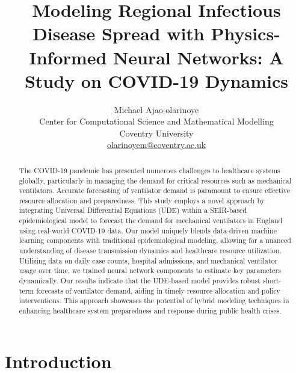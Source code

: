 \documentclass[12pt]{article}
\title{Modeling Regional Infectious Disease Spread with Physics-Informed Neural Networks: A Study on COVID-19 Dynamics}
\author{Michael Ajao-olarinoye \\
    Center for Computational Science and Mathematical Modelling \\
    Coventry University \\
    \url{olarinoyem@coventry.ac.uk}}
\date{}
\begin{document}
\maketitle

\begin{abstract}
    The COVID-19 pandemic has presented numerous challenges to healthcare systems globally, particularly in managing the demand for critical resources such as mechanical ventilators. Accurate forecasting of ventilator demand is paramount to ensure effective resource allocation and preparedness. This study employs a novel approach by integrating Universal Differential Equations (UDE) within a SEIR-based epidemiological model to forecast the demand for mechanical ventilators in England using real-world COVID-19 data. Our model uniquely blends data-driven machine learning components with traditional epidemiological modeling, allowing for a nuanced understanding of disease transmission dynamics and healthcare resource utilization. Utilizing data on daily case counts, hospital admissions, and mechanical ventilator usage over time, we trained neural network components to estimate key parameters dynamically. Our results indicate that the UDE-based model provides robust short-term forecasts of ventilator demand, aiding in timely resource allocation and policy interventions. This approach showcases the potential of hybrid modeling techniques in enhancing healthcare system preparedness and response during public health crises.
\end{abstract}

\section{Introduction}
\end{document}
